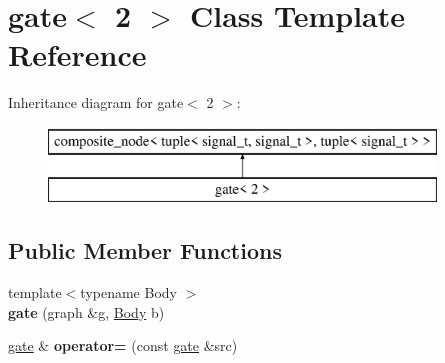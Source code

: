 \hypertarget{classgate_3_012_01_4}{}\section{gate$<$ 2 $>$ Class Template Reference}
\label{classgate_3_012_01_4}
Inheritance diagram for gate$<$ 2 $>$\+:\begin{figure}[H]
\begin{center}
\leavevmode
\includegraphics[height=2.000000cm]{classgate_3_012_01_4}
\end{center}
\end{figure}
\subsection*{Public Member Functions}
\begin{DoxyCompactItemize}
\item 
\hypertarget{classgate_3_012_01_4_a1ca07ce2664d335e1bb65e25b582d60c}{}{\footnotesize template$<$typename Body $>$ }\\{\bfseries gate} (graph \&g, \hyperlink{classBody}{Body} b)\label{classgate_3_012_01_4_a1ca07ce2664d335e1bb65e25b582d60c}

\item 
\hypertarget{classgate_3_012_01_4_a8ae13e50d40001e62aa05948f39769e5}{}\hyperlink{classgate}{gate} \& {\bfseries operator=} (const \hyperlink{classgate}{gate} \&src)\label{classgate_3_012_01_4_a8ae13e50d40001e62aa05948f39769e5}

\end{DoxyCompactItemize}
